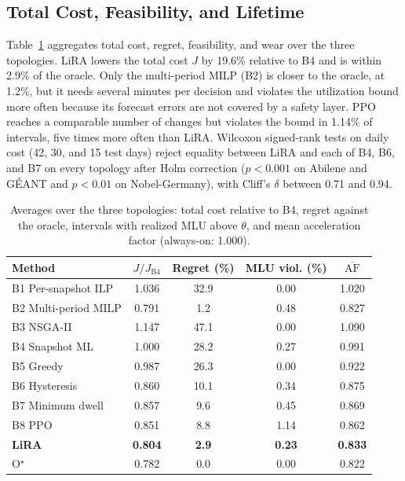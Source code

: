 \documentclass[conference]{IEEEtran}
\begin{document}
\subsection{Total Cost, Feasibility, and Lifetime}

Table~\ref{tab:cost} aggregates total cost, regret, feasibility, and wear over the three topologies. LiRA lowers the total cost $J$ by 19.6\% relative to B4 and is within 2.9\% of the oracle. Only the multi-period MILP (B2) is closer to the oracle, at 1.2\%, but it needs several minutes per decision and violates the utilization bound more often because its forecast errors are not covered by a safety layer. PPO reaches a comparable number of changes but violates the bound in 1.14\% of intervals, five times more often than LiRA. Wilcoxon signed-rank tests on daily cost (42, 30, and 15 test days) reject equality between LiRA and each of B4, B6, and B7 on every topology after Holm correction ($p<0.001$ on Abilene and G\'{E}ANT and $p<0.01$ on Nobel-Germany), with Cliff's $\delta$ between 0.71 and 0.94.

\begin{table}[t]
\centering
\caption{Averages over the three topologies: total cost relative to B4, regret against the oracle, intervals with realized MLU above $\theta$, and mean acceleration factor (always-on: 1.000).}
\label{tab:cost}
\footnotesize
\setlength{\tabcolsep}{4pt}
\begin{tabular}{@{}lcccc@{}}
\toprule
Method & $J/J_{\mathrm{B4}}$ & Regret (\%) & MLU viol. (\%) & $\overline{\mathrm{AF}}$ \\
\midrule
B1 Per-snapshot ILP & 1.036 & 32.9 & 0.00 & 1.020 \\
B2 Multi-period MILP & 0.791 & 1.2 & 0.48 & 0.827 \\
B3 NSGA-II & 1.147 & 47.1 & 0.00 & 1.090 \\
B4 Snapshot ML & 1.000 & 28.2 & 0.27 & 0.991 \\
B5 Greedy & 0.987 & 26.3 & 0.00 & 0.922 \\
B6 Hysteresis & 0.860 & 10.1 & 0.34 & 0.875 \\
B7 Minimum dwell & 0.857 & 9.6 & 0.45 & 0.869 \\
B8 PPO & 0.851 & 8.8 & 1.14 & 0.862 \\
\midrule
\textbf{LiRA} & \textbf{0.804} & \textbf{2.9} & \textbf{0.23} & \textbf{0.833} \\
O$^\star$ & 0.782 & 0.0 & 0.00 & 0.822 \\
\bottomrule
\end{tabular}
\end{table}
\end{document}
